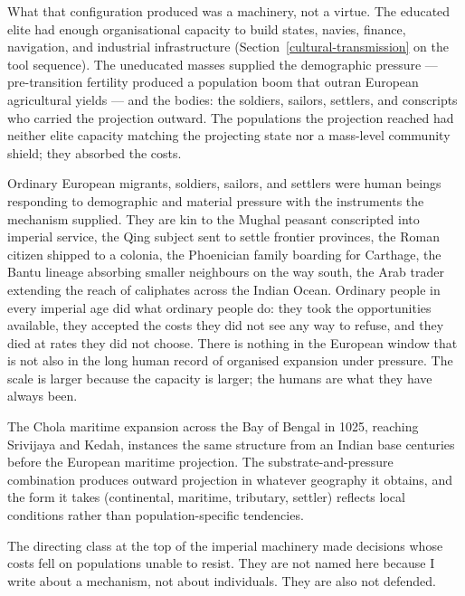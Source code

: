\documentclass[12pt,letterpaper]{article}
\begin{document}
What that configuration produced was a machinery, not a virtue. The
educated elite had enough organisational capacity to build states,
navies, finance, navigation, and industrial infrastructure
(Section~\ref{cultural-transmission} on the tool sequence). The
uneducated masses supplied the demographic pressure --- pre-transition
fertility produced a population boom that outran European agricultural
yields --- and the bodies: the soldiers, sailors, settlers, and
conscripts who carried the projection outward. The populations the
projection reached had neither elite capacity matching the projecting
state nor a mass-level community shield; they absorbed the costs.

Ordinary European migrants, soldiers, sailors, and settlers were human
beings responding to demographic and material pressure with the
instruments the mechanism supplied. They are kin to the Mughal peasant
conscripted into imperial service, the Qing subject sent to settle
frontier provinces, the Roman citizen shipped to a colonia, the
Phoenician family boarding for Carthage, the Bantu lineage absorbing
smaller neighbours on the way south, the Arab trader extending the
reach of caliphates across the Indian Ocean. Ordinary people in every
imperial age did what ordinary people do: they took the opportunities
available, they accepted the costs they did not see any way to refuse,
and they died at rates they did not choose. There is nothing in the
European window that is not also in the long human record of organised
expansion under pressure. The scale is larger because the capacity is
larger; the humans are what they have always been.

The Chola maritime expansion across the Bay of Bengal in 1025,
reaching Srivijaya and Kedah, instances the same structure from an
Indian base centuries before the European maritime projection. The
substrate-and-pressure combination produces outward projection in
whatever geography it obtains, and the form it takes (continental,
maritime, tributary, settler) reflects local conditions rather than
population-specific tendencies.

The directing class at the top of the imperial machinery made
decisions whose costs fell on populations unable to resist. They are
not named here because I write about a mechanism, not about
individuals. They are also not defended.
\end{document}

